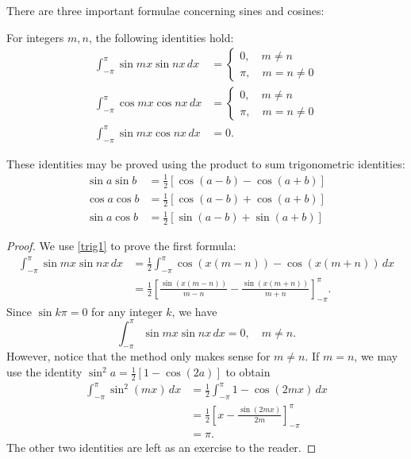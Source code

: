 \documentclass{amsart}
\begin{document}
  There are three important formulae concerning sines and cosines:
  \begin{theorem}
    For integers $m, n$, the following identities hold:
    \begin{align}
      \int_{-\pi}^{\pi} \sin mx \sin nx\, dx &= \begin{cases} 0, \quad m\neq n \\ \pi, \quad m = n \neq 0 \end{cases} \\
      \int_{-\pi}^{\pi} \cos mx \cos nx\, dx &= \begin{cases} 0, \quad m\neq n \\ \pi, \quad m = n \neq 0 \end{cases} \\
      \int_{-\pi}^{\pi} \sin mx \cos nx\, dx &= 0.
    \end{align}
  \end{theorem}
  These identities may be proved using the product to sum trigonometric identities:
  \begin{align}
    \sin a \sin b &= \frac{1}{2}[\cos(a-b) - \cos(a+b)] \label{trig1}\\
    \cos a \cos b &= \frac{1}{2} [\cos (a-b) + \cos(a+b)] \label {trig2}\\
    \sin a \cos b &= \frac{1}{2}[\sin (a-b) + \sin(a+b)] \label{trig3}
  \end{align}
  \begin{proof}
    We use \ref{trig1} to prove the first formula:
    \begin{align*}
      \int_{-\pi}^{\pi} \sin mx \sin nx\, dx &= \frac{1}{2} \int_{-\pi}^{\pi} \cos(x(m-n)) - \cos(x(m+n))\, dx \\
                                             &= \frac{1}{2} \left[ \frac{\sin(x(m-n))}{m-n} - \frac{\sin(x(m+n))}{m+n} \right]_{-\pi}^{\pi}.
    \end{align*}
    Since $\sin k\pi = 0$ for any integer $k$, we have \[
      \int_{-\pi}^{\pi} \sin mx \sin nx \, dx = 0, \quad m\neq n
    .\] However, notice that the method only makes sense for $m\neq n$. If $m = n$, we may use the identity $\sin^2 a = \frac{1}{2}[1 - \cos(2a)]$ to obtain 
    \begin{align*}
      \int_{-\pi}^{\pi} \sin^2(mx)\, dx &= \frac{1}{2} \int_{-\pi}^{\pi} 1 - \cos(2mx)\, dx \\
                                        &= \frac{1}{2} \left[ x - \frac{\sin (2mx)}{2m} \right]_{-\pi}^{\pi} \\
                                        &= \pi.
    \end{align*}
    The other two identities are left as an exercise to the reader.
  \end{proof}
\end{document}
